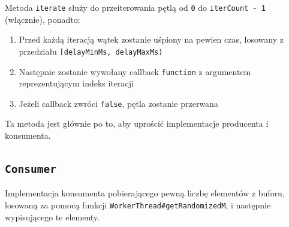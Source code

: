 \documentclass[11pt]{article}
\providecommand{\tightlist}{%
      \setlength{\itemsep}{0pt}\setlength{\parskip}{0pt}}
\begin{document}
Metoda \texttt{iterate} służy do przeiterowania pętlą od \texttt{0} do
\texttt{iterCount\ -\ 1} (włącznie), ponadto:

\begin{enumerate}
\def\labelenumi{\arabic{enumi}.}
\tightlist
\item
  Przed każdą iteracją wątek zostanie uśpiony na pewien czas, losowany z
  przedziału \texttt{{[}delayMinMs,\ delayMaxMs)}
\item
  Następnie zostanie wywołany callback \texttt{function} z argumentem
  reprezentującym indeks iteracji
\item
  Jeżeli callback zwróci \texttt{false}, pętla zostanie przerwana
\end{enumerate}

Ta metoda jest głównie po to, aby uprościć implementacje producenta i
konsumenta.

    \hypertarget{consumer}{%
\subsection{\texorpdfstring{\texttt{Consumer}}{Consumer}}\label{consumer}}

Implementacja konsumenta pobierającego pewną liczbę elementów z buforu,
losowaną za pomocą funkcji \texttt{WorkerThread\#getRandomizedM}, i
następnie wypisującego te elementy.
\end{document}
